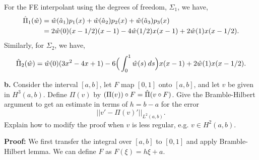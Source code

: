 \documentclass[11pt]{article}
\begin{document}
For the FE interpolant using the degrees of freedom, $\Sigma_1$, we have,
\begin{align*}
    \Hat{\Pi}_1(\Hat{w}) &= \Hat{w}(\Hat{a}_1) p_1(x) + \Hat{w}(\Hat{a}_2) p_2(x) + \Hat{w}(\Hat{a}_3) p_3(x) \\
    &= 2\Hat{w}(0)(x - 1/2)(x-1) -4 \Hat{w}(1/2) x (x-1) + 2\Hat{w}(1) x (x - 1/2).
\end{align*}
Similarly, for $\Sigma_2$, we have,
\begin{equation*}
	\Hat{\Pi}_2(\Hat{w}) = \Hat{w}(0) (3x^2 - 4x + 1) - 6 \Big(\int_0^1 \Hat{w}(s) \: ds\Big) x (x - 1) + 2\Hat{w}(1) x (x - 1/2).
\end{equation*}

\vskip 2cm


\textbf{b.} Consider the interval $[a,b]$, let $F$ map $[0,1]$ onto $[a,b]$, and let $v$ be given in $H^3(a,b)$.
Define $\Pi(v)$ by $(\Pi(v))\circ F = \Hat{\Pi} (v\circ F)$.
Give the Bramble-Hilbert argument to get an estimate in terms of $h = b - a$ for the error 
\begin{equation}
    ||v' - \Pi(v)'||_{L^2(a,b)}.
\end{equation}
Explain how to modify the proof when $v$ is less regular, e.g. $v \in H^2(a,b)$.

\vskip 1cm


\textbf{Proof:} We first transfer the integral over $[a,b]$ to $[0,1]$ and apply Bramble-Hilbert lemma. 
We can define $F$ as $F(\xi) = h\xi + a$.
\end{document}
